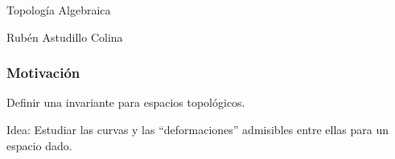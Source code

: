 \documentclass[xetex,mathserif,serif]{beamer}
\begin{document}
  \begin{frame}
    \begin{block}{}
      \centering
      Topología Algebraica
    \end{block}
    \begin{block}{}
      \centering
      Rubén Astudillo Colina
    \end{block}

  \end{frame}

  \begin{frame}
    \frametitle{Motivación}

    \begin{block}{}
      Definir una invariante para espacios topológicos.
    \end{block}

    \pause

    \begin{block}{}
      Idea: Estudiar las curvas y las ``deformaciones'' admisibles entre
      ellas para un espacio dado.
    \end{block}
  \end{frame}
\end{document}
